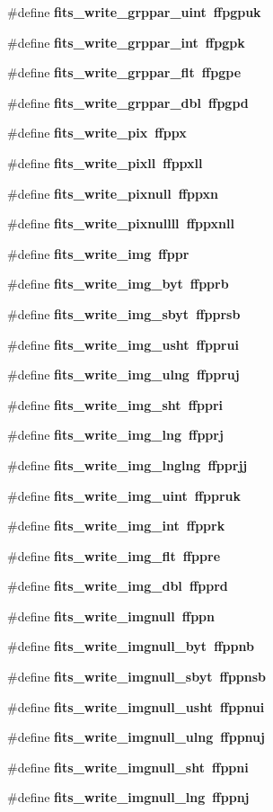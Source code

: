 \begin{CompactItemize}
\item 
\#define \bf{fits\_\-write\_\-grppar\_\-uint}~ffpgpuk
\item 
\#define \bf{fits\_\-write\_\-grppar\_\-int}~ffpgpk
\item 
\#define \bf{fits\_\-write\_\-grppar\_\-flt}~ffpgpe
\item 
\#define \bf{fits\_\-write\_\-grppar\_\-dbl}~ffpgpd
\item 
\#define \bf{fits\_\-write\_\-pix}~ffppx
\item 
\#define \bf{fits\_\-write\_\-pixll}~ffppxll
\item 
\#define \bf{fits\_\-write\_\-pixnull}~ffppxn
\item 
\#define \bf{fits\_\-write\_\-pixnullll}~ffppxnll
\item 
\#define \bf{fits\_\-write\_\-img}~ffppr
\item 
\#define \bf{fits\_\-write\_\-img\_\-byt}~ffpprb
\item 
\#define \bf{fits\_\-write\_\-img\_\-sbyt}~ffpprsb
\item 
\#define \bf{fits\_\-write\_\-img\_\-usht}~ffpprui
\item 
\#define \bf{fits\_\-write\_\-img\_\-ulng}~ffppruj
\item 
\#define \bf{fits\_\-write\_\-img\_\-sht}~ffppri
\item 
\#define \bf{fits\_\-write\_\-img\_\-lng}~ffpprj
\item 
\#define \bf{fits\_\-write\_\-img\_\-lnglng}~ffpprjj
\item 
\#define \bf{fits\_\-write\_\-img\_\-uint}~ffppruk
\item 
\#define \bf{fits\_\-write\_\-img\_\-int}~ffpprk
\item 
\#define \bf{fits\_\-write\_\-img\_\-flt}~ffppre
\item 
\#define \bf{fits\_\-write\_\-img\_\-dbl}~ffpprd
\item 
\#define \bf{fits\_\-write\_\-imgnull}~ffppn
\item 
\#define \bf{fits\_\-write\_\-imgnull\_\-byt}~ffppnb
\item 
\#define \bf{fits\_\-write\_\-imgnull\_\-sbyt}~ffppnsb
\item 
\#define \bf{fits\_\-write\_\-imgnull\_\-usht}~ffppnui
\item 
\#define \bf{fits\_\-write\_\-imgnull\_\-ulng}~ffppnuj
\item 
\#define \bf{fits\_\-write\_\-imgnull\_\-sht}~ffppni
\item 
\#define \bf{fits\_\-write\_\-imgnull\_\-lng}~ffppnj

\end{CompactItemize}
